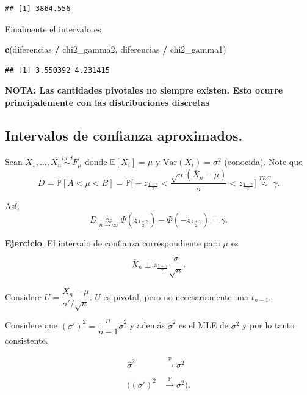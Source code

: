 \documentclass[
  12pt,
]{book}
\newenvironment{Shaded}{\begin{snugshade}}{\end{snugshade}}
\newcommand{\KeywordTok}[1]{\textcolor[rgb]{0.13,0.29,0.53}{\textbf{#1}}}
\newcommand{\NormalTok}[1]{#1}
\newcommand{\OperatorTok}[1]{\textcolor[rgb]{0.81,0.36,0.00}{\textbf{#1}}}
\newcommand{\StringTok}[1]{\textcolor[rgb]{0.31,0.60,0.02}{#1}}
\begin{document}
\begin{verbatim}
## [1] 3864.556
\end{verbatim}

Finalmente el intervalo es

\begin{Shaded}
\begin{Highlighting}[]
\KeywordTok{c}\NormalTok{(diferencias }\OperatorTok{/}\StringTok{ }\NormalTok{chi2\_gamma2, diferencias }\OperatorTok{/}\StringTok{ }\NormalTok{chi2\_gamma1)}
\end{Highlighting}
\end{Shaded}

\begin{verbatim}
## [1] 3.550392 4.231415
\end{verbatim}

\textbf{NOTA: Las cantidades pivotales no siempre existen. Esto ocurre principalemente
con las distribuciones discretas}

\hypertarget{intervalos-de-confianza-aproximados.}{%
\subsection{Intervalos de confianza aproximados.}\label{intervalos-de-confianza-aproximados.}}

Sean \(X_1,\dots, X_n \stackrel{i.i.d}{\sim}F_{\mu}\) donde \(\mathbb{E}[X_i] = \mu\) y
\(\text{Var}(X_i) = \sigma^2\) (conocida). Note que \[D = \mathbb P[A<\mu<B] = \mathbb P
\bigg[-z_{\frac{1+\gamma}2}<\dfrac{\sqrt n(\bar X_n-\mu)}{\sigma} <z_{\frac{1+\gamma}2}\bigg]
\stackrel{TLC}{\approx} \gamma.\]

Así, \[D \underset{n\to\infty}{\approx}
\Phi\left(z_{\frac{1+\gamma}2}\right)-\Phi\left(-z_{\frac{1+\gamma}2}\right) = \gamma.\]

\textbf{Ejercicio}. El intervalo de confianza correspondiente para \(\mu\) es

\[
\bar
X_n \pm z_{\frac{1+\gamma}2}\dfrac{\sigma}{\sqrt n}.
\]

Considere \(U = \dfrac{\bar X_n - \mu}{\sigma'/\sqrt n}\). \(U\) es pivotal, pero no
necesariamente una \(t_{n-1}\).

Considere que \((\sigma')^2 = \dfrac{n}{n-1}\hat \sigma^2\) y además \(\hat\sigma^2\) es el MLE de
\(\sigma^2\) y por lo tanto consistente.

\begin{align*}
\hat{\sigma}^2 &\xrightarrow[]{\mathbb{P}}\sigma^2 \\
((\sigma')^2 &\xrightarrow[]{\mathbb{P}}\sigma^2).
\end{align*}
\end{document}
